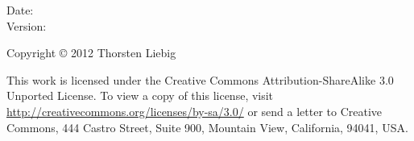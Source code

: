 \textbf{\displaytitle}

Date: \echodate \\
Version: \echoversion

Copyright © 2012 Thorsten Liebig

This work is licensed under the Creative Commons Attribution-ShareAlike 3.0 Unported License.
To view a copy of this license, visit \url{http://creativecommons.org/licenses/by-sa/3.0/} or send a letter to Creative Commons, 444 Castro Street, Suite 900, Mountain View, California, 94041, USA.
